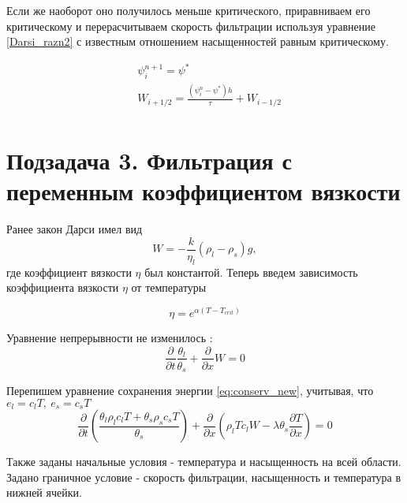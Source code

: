 \documentclass[12pt]{article}
\newcommand{\pd}[2]{\frac{\partial #1}{\partial #2}}
\begin{document}
Если же наоборот оно получилось меньше критического, приравниваем его критическому и перерасчитываем скорость фильтрации используя уравнение \eqref{Darsi_razn2} с известным отношением насыщенностей равным критическому.

\begin{equation}
\begin{aligned}
&\psi_{i}^{n+1} = \psi^* \\
&W_{i+1/2} = \frac{(\psi_i^n - \psi^*)h}{\tau} + W_{i-1/2} \\
\end{aligned}
\label{corr_razn}
\end{equation}

\newpage
\section*{Подзадача 3. Фильтрация с переменным коэффициентом вязкости}

Ранее закон Дарси имел вид 
$$
W= -\frac{k}{\eta_l}(\rho_l-\rho_s)g,
$$
где коэффициент вязкости $\eta $ был константой. Теперь введем зависимость коэффициента вязкости 	$ \eta $ от температуры

\begin{equation}
\eta = e^{\alpha(T - T_{crit})}
\label{viscos}
\end{equation}

Уравнение непрерывности не изменилось :
$$
\pd{}{t}\frac{\theta_l}{\theta_s} + \pd{}{x}W = 0
$$

Перепишем уравнение сохранения энергии \eqref{eq:conserv_new}, учитывая, что $ e_l = c_lT,\ e_s = c_sT $ 
\begin{equation}
\pd{}{t} \left(\frac{\theta_l \rho_l c_l T + \theta_s \rho_s c_s T}{\theta_s}\right) + \pd{}{x}\left(\rho_l T c_l W - \lambda \theta_s \pd{T}{x}\right) = 0
\label{conserv}
\end{equation}

Также заданы начальные условия -  температура и насыщенность на всей области. Задано граничное условие - скорость фильтрации, насыщенность и температура в нижней ячейки.
\end{document}
